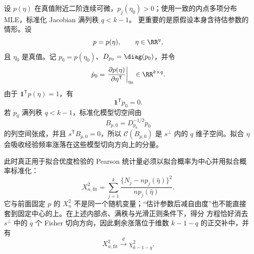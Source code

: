 \begin{theorem}
设 $p(\eta)$ 在真值附近二阶连续可微，$p_j(\eta_0)>0$；使用一致的内点多项分布 MLE，标准化 Jacobian 满列秩 $q<k-1$。
更重要的是原假设本身含待估参数的情形。设
\[
 p=p(\eta),
 \qquad
 \eta\in\RR^q,
\]
且 $\eta_0$ 是真值。记 $p_0=p(\eta_0)$、$D_{p_0}=\diag(p_0)$，并令
\[
 \dot p_0
 =\left.
 \frac{\partial p(\eta)}{\partial\eta^{\mathsf T}}
 \right|_{\eta_0}
 \in\RR^{k\times q}.
\]
由于 $\mathbf1^{\mathsf T}p(\eta)=1$，有
\[
 \mathbf1^{\mathsf T}\dot p_0=0.
\]
若 $\dot p_0$ 满列秩 $q<k-1$，标准化模型切空间由
\[
 B_{p,0}=D_{p_0}^{-1/2}\dot p_0
\]
的列空间张成，并且 $s^{\mathsf T}B_{p,0}=0$，所以 $\mathcal C(B_{p,0})$ 是 $s^\perp$ 内的 $q$ 维子空间。拟合 $\eta$ 会吸收经验频率涨落在这些模型切向方向上的分量。

此时真正用于拟合优度检验的 Pearson 统计量必须以拟合概率为中心并用拟合概率标准化：
\[
 X_{n,\mathrm{fit}}^2
 =\sum_{j=1}^k
 \frac{\{N_j-np_j(\widehat\eta)\}^2}
 {np_j(\widehat\eta)}.
\]
它与前面固定 $p$ 的 $X_n^2$ 不是同一个随机变量；“估计参数后减自由度”也不能直接套到固定中心的上。在上述内部点、满秩与光滑正则条件下，得分 方程恰好消去 $s^\perp$ 中的 $q$ 个 Fisher 切向方向，因此剩余涨落位于维数 $k-1-q$ 的正交补中，并有
\begin{equation}\label{eq:math-stat-pearson-fitted-df}
 X_{n,\mathrm{fit}}^2\xrightarrow{d}\chi^2_{k-1-q}.
\end{equation}
\end{theorem}


